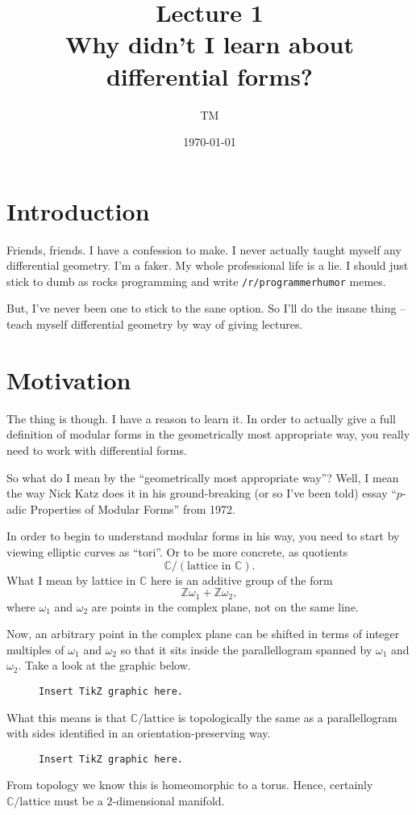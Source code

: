 \documentclass{article}
\title{Lecture 1\\Why didn't I learn about differential forms?}
\author{TM}
\date{\today}
\theoremstyle{definition}
\begin{document}
\section*{Introduction}
Friends, friends. I have a confession to make. I never actually taught myself any differential geometry. I'm a faker. My whole professional life is a lie. I should just stick to dumb as rocks programming and write {\tt /r/programmerhumor} memes.

But, I've never been one to stick to the sane option. So I'll do the insane thing -- teach myself differential geometry by way of giving lectures.
\section*{Motivation}
The thing is though. I have a reason to learn it. In order to actually give a full definition of modular forms in the geometrically most appropriate way, you really need to work with differential forms.

So what do I mean by the ``geometrically most appropriate way''? Well, I mean the way Nick Katz does it in his ground-breaking (or so I've been told) essay ``$p$-adic Properties of Modular Forms'' from 1972.

In order to begin to understand modular forms in his way, you need to start by viewing elliptic curves as ``tori''. Or to be more concrete, as quotients
\[\mathbb{C}/(\text{lattice in $\mathbb{C}$}).\]
What I mean by lattice in $\mathbb{C}$ here is an additive group of the form
\[\mathbb{Z}\omega_1+\mathbb{Z}\omega_2,\]
where $\omega_1$ and $\omega_2$ are points in the complex plane, not on the same line.

Now, an arbitrary point in the complex plane can be shifted in terms of integer multiples of $\omega_1$ and $\omega_2$ so that it sits inside the parallellogram spanned by $\omega_1$ and $\omega_2$. Take a look at the graphic below.
\begin{figure}[h]
  \centering
  {\tt Insert TikZ graphic here.}
\end{figure}

What this means is that $\mathbb{C}/\text{lattice}$ is topologically the same as a parallellogram with sides identified in an orientation-preserving way.

\begin{figure}[h]
  \centering
  {\tt Insert TikZ graphic here.}
\end{figure}

From topology we know this is homeomorphic to a torus. Hence, certainly $\mathbb{C}/\text{lattice}$ must be a $2$-dimensional manifold.
\end{document}
